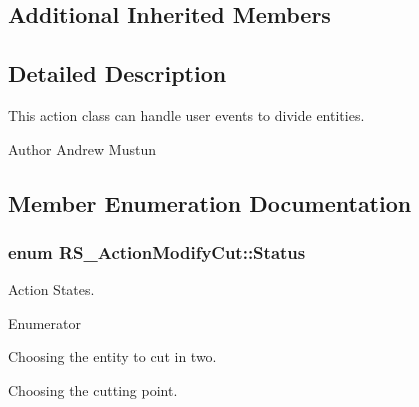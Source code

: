 \subsection*{Additional Inherited Members}


\subsection{Detailed Description}
This action class can handle user events to divide entities.

\begin{DoxyAuthor}{Author}
Andrew Mustun 
\end{DoxyAuthor}


\subsection{Member Enumeration Documentation}
\hypertarget{classRS__ActionModifyCut_a5777f39854f76d3b456617bdd165f675}{
\subsubsection[{Status}]{\setlength{\rightskip}{0pt plus 5cm}enum {\bf R\-S\-\_\-\-Action\-Modify\-Cut\-::\-Status}}}\label{classRS__ActionModifyCut_a5777f39854f76d3b456617bdd165f675}
Action States. \begin{Desc}
\item[Enumerator]\par
\begin{description}
\item[{\em 
\hypertarget{classRS__ActionModifyCut_a5777f39854f76d3b456617bdd165f675a04b69f4bb1a0a61d4cfd016f24ed6895}{Choose\-Cut\-Entity}\label{classRS__ActionModifyCut_a5777f39854f76d3b456617bdd165f675a04b69f4bb1a0a61d4cfd016f24ed6895}
}]Choosing the entity to cut in two. \item[{\em 
\hypertarget{classRS__ActionModifyCut_a5777f39854f76d3b456617bdd165f675a037a12bfeb22b9e8a782c7e03d028b41}{Set\-Cut\-Coord}\label{classRS__ActionModifyCut_a5777f39854f76d3b456617bdd165f675a037a12bfeb22b9e8a782c7e03d028b41}
}]Choosing the cutting point. \end{description}
\end{Desc}


